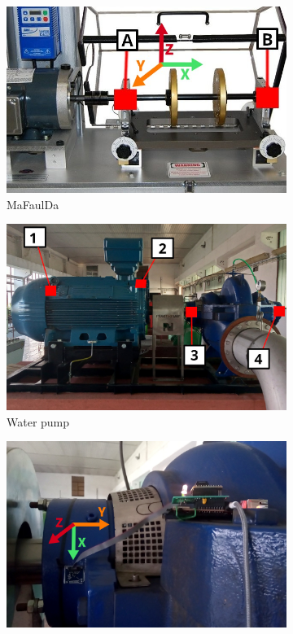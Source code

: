 \documentclass{llncs}
\begin{document}
\begin{figure}
     \begin{subfigure}[b]{0.24\textwidth}
         \centering
         \includegraphics[width=\textwidth]{fig/sensor/mafaulda-simulator.jpg}
         \caption{MaFaulDa}
         \label{fig:mafaulda-simulator}
     \end{subfigure}
     \hfill
     \begin{subfigure}[b]{0.24\textwidth}
         \centering
         \includegraphics[width=\textwidth]{fig/sensor/ksb-pump.jpg}
         \caption{Water pump}
         \label{fig:water-pump}
     \end{subfigure}
     \hfill
     \begin{subfigure}[b]{0.24\textwidth}
         \centering
         \includegraphics[width=\textwidth]{fig/sensor/sensor.jpg}

\end{subfigure}
\end{figure}
\end{document}
